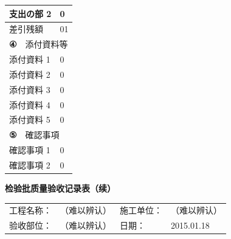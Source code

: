 \documentclass[UTF8,10pt,a4paper,fontset=fandol]{ctexart}
\newcommand{\fieldvalue}[1]{#1}
\newcommand{\handwritten}[1]{#1}
\begin{document}
\begin{tabularx}{\textwidth}{|X|p{}|}
\hline
支出の部 2 &
\fieldvalue{\handwritten{0}}\\
\hline
差引残額 &
\fieldvalue{\handwritten{01}}\\
\hline
\multicolumn{2}{|l|}{\textbf{④}　添付資料等}\\
\hline
添付資料 1 &
\fieldvalue{\handwritten{0}}\\
\hline
添付資料 2 &
\fieldvalue{\handwritten{0}}\\
\hline
添付資料 3 &
\fieldvalue{\handwritten{0}}\\
\hline
添付資料 4 &
\fieldvalue{\handwritten{0}}\\
\hline
添付資料 5 &
\fieldvalue{\handwritten{0}}\\
\hline
\multicolumn{2}{|l|}{\textbf{⑤}　確認事項}\\
\hline
確認事項 1 &
\fieldvalue{\handwritten{0}}\\
\hline
確認事項 2 &
\fieldvalue{\handwritten{0}}\\
\hline
\end{tabularx}


\newpage

\begin{center}
\textbf{检验批质量验收记录表（续）}
\end{center}

\noindent
\begin{tabularx}{\textwidth}{@{}lXlX@{}}
工程名称：&
\fieldvalue{\handwritten{（难以辨认）}}&
施工单位：&
\fieldvalue{\handwritten{（难以辨认）}}\\
验收部位：&
\fieldvalue{\handwritten{（难以辨认）}}&
日期：&
\fieldvalue{\handwritten{2015.01.18}}
\end{tabularx}
\end{document}
